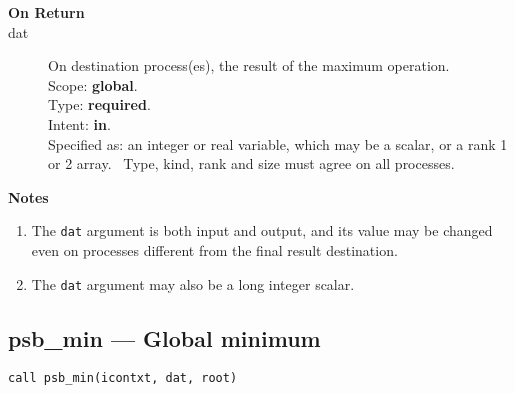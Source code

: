 \begin{description}
\item[\bf On Return]
\item[dat] On destination process(es), the result of the maximum operation.\\
Scope: {\bf global}.\\
Type: {\bf required}.\\
Intent: {\bf in}.\\
Specified as: an integer or  real variable, which may be a
scalar, or a rank 1 or 2 array. \
Type, kind, rank and size must agree on all processes.
\end{description}


{\par\noindent\large\bfseries Notes}
\begin{enumerate}
\item The \verb|dat| argument is both input and output, and its
  value may be changed even on processes different from the final
  result destination.
\item The \verb|dat| argument may also be a long integer scalar.
\end{enumerate}

\clearpage\subsection*{psb\_min --- Global minimum}

\begin{verbatim}
call psb_min(icontxt, dat, root)
\end{verbatim}

